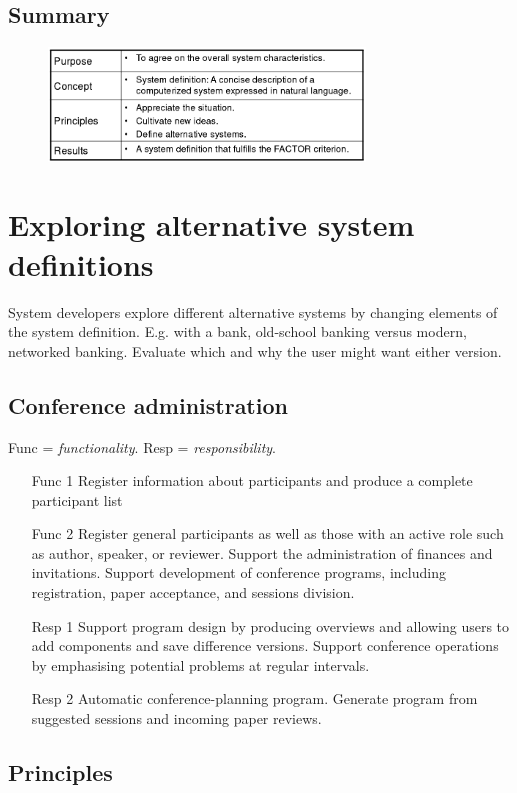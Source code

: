 \subsection{Summary}
\begin{figure}[H]
    \centering
    \includegraphics[width=0.75\textwidth]{figures/systemchoicesummary.png}
\end{figure}

\section{Exploring alternative system definitions}
System developers explore different alternative systems by changing elements of the system definition. E.g. with a bank, old-school banking versus modern, networked banking. Evaluate which and why the user might want either version.

\subsection{Conference administration}
Func = \textit{functionality}. Resp = \textit{responsibility}.
\begin{itemize}
    \item[Func 1] Register information about participants and produce a complete participant list
    \item[Func 2] Register general participants as well as those with an active role such as author, speaker, or reviewer. Support the administration of finances and invitations. Support development of conference programs, including registration, paper acceptance, and sessions division.
    \item[Resp 1] Support program design by producing overviews and allowing users to add components and save difference versions. Support conference operations by emphasising potential problems at regular intervals.
    \item[Resp 2] Automatic conference-planning program. Generate program from suggested sessions and incoming paper reviews.
\end{itemize}

\subsection{Principles}
